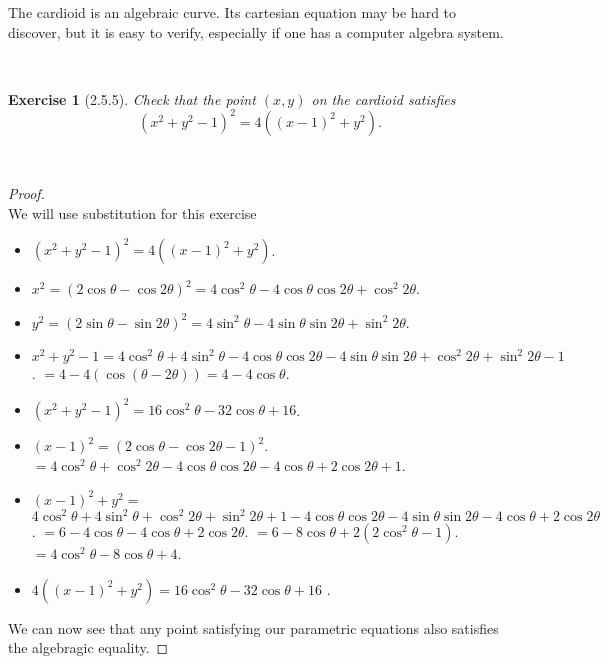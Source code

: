 \documentclass[12pt]{article}
\newcommand{\XB}{\color{black}}
\newcommand{\XBB}{\color{blue}}
\theoremstyle{plain}
\newtheorem{ex}{Exercise}
\begin{document}
\newpage

\begin{center}
  The cardioid is an algebraic curve. Its cartesian equation may be hard to discover, but it is easy to verify, especially if one has a computer algebra system.
\end{center}

\XBB\hrulefill\XB \\
\begin{ex} [2.5.5]
  Check that the point $(x,y)$ on the cardioid satisfies
  \[
    (x^2+y^2-1)^2=4((x-1)^2+y^2).
  \]
\end{ex}
\XBB\hrulefill\XB \\

\begin{proof}
  \ \\

  We will use substitution for this exercise

  \begin{itemize}
    \item $ (x^{2} + y^{2} - 1)^{2} = 4((x-1)^{2} + y^{2}) $.
    \item $ x^{2} = (2\cos\theta - \cos2\theta)^{2} = 4\cos^{2}\theta - 4\cos\theta\cos2\theta + \cos^{2}2\theta $.
    \item $ y^{2} = (2\sin\theta - \sin2\theta)^{2} = 4\sin^{2}\theta - 4\sin\theta\sin2\theta + \sin^{2}2\theta $.
    \item $ x^{2} + y^{2} - 1 = 4\cos^{2}\theta + 4\sin^{2}\theta - 4\cos\theta\cos2\theta - 4\sin\theta\sin2\theta + \cos^{2}2\theta + \sin^{2}2\theta - 1 $.
    \subitem $ = 4 - 4(\cos(\theta - 2\theta)) = 4 - 4\cos\theta $.
    \item $ (x^{2} + y^{2} - 1)^{2} = 16\cos^{2}\theta - 32\cos\theta + 16 $.
    \item $ (x-1)^{2} = (2\cos\theta - \cos2\theta -1)^2 $.
    \subitem $ = 4\cos^{2}\theta + \cos^{2}2\theta - 4\cos\theta\cos2\theta - 4\cos\theta + 2\cos2\theta + 1 $.
    \item $ (x-1)^{2} + y^{2} = $ 
    \subitem $ 4\cos^{2}\theta + 4\sin^{2}\theta + \cos^{2}2\theta + \sin^{2}2\theta + 1 - 4\cos\theta\cos2\theta - 4\sin\theta\sin2\theta - 4\cos\theta + 2\cos2\theta $.
    \subitem $ = 6 - 4\cos\theta - 4\cos\theta + 2\cos2\theta $.
    \subitem $ = 6 - 8\cos\theta + 2(2\cos^{2}\theta - 1) $.
    \subitem $ = 4\cos^2\theta - 8\cos\theta + 4 $.
    \item $ 4((x-1)^{2} + y^{2}) = 16\cos^{2}\theta - 32\cos\theta + 16 $ .
  \end{itemize}

  We can now see that any point satisfying our parametric equations also satisfies the algebragic equality.

\end{proof}
\end{document}
